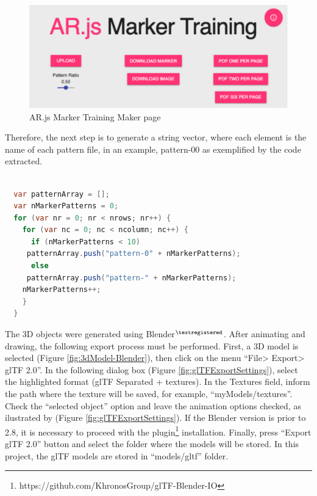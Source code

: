 \begin{figure}[!hbt]
\begin{center}
\includegraphics[width=1\linewidth]{img/cap5/jeromeetienneAR-Maker}
\caption{AR.js Marker Training Maker page} \label{fig:jeromeetienneAR-Maker}
\end{center}
\end{figure}

Therefore, the next step is to generate a string vector, where each element is the name of each pattern file, in an example, pattern-00 as exemplified by the code extracted. \newline


\begin{lstlisting}[frame=single,language=Java]  % Start your code-block

  var patternArray = [];
  var nMarkerPatterns = 0;
  for (var nr = 0; nr < nrows; nr++) {
    for (var nc = 0; nc < ncolumn; nc++) {
      if (nMarkerPatterns < 10)
	 patternArray.push("pattern-0" + nMarkerPatterns);
      else
	 patternArray.push("pattern-" + nMarkerPatterns);
    nMarkerPatterns++;
    }
  }
\end{lstlisting}


The 3D objects were generated using Blender$^{\textregistered}$. After animating and drawing, the following export process must be performed. First, a 3D model is selected (Figure \ref{fig:3dModel-Blender}), then click on the menu ``File> Export> glTF 2.0''. In the following dialog box (Figure \ref{fig:glTFExportSettings}), select the highlighted format (glTF Separated + textures). In the Textures field, inform the path where the texture will be saved, for example, ``myModels/textures''. Check the ``selected object'' option and leave the animation options checked, as ilustrated by (Figure \ref{fig:glTFExportSettings}). If the Blender version is prior to 2.8, it is necessary to proceed with the plugin\footnote{https://github.com/KhronosGroup/glTF-Blender-IO} installation. Finally, press ``Export glTF 2.0'' button and select the folder where the models will be stored. In this project, the glTF models are stored in ``models/gltf'' folder.

